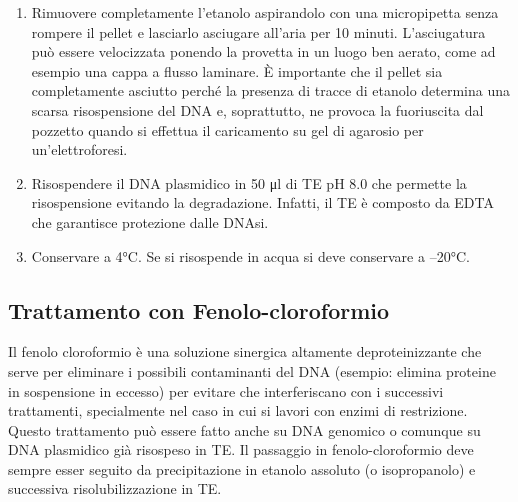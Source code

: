 \begin{enumerate}
  \item Rimuovere completamente l’etanolo aspirandolo con una micropipetta senza rompere il pellet e lasciarlo asciugare
	all’aria per 10 minuti. L’asciugatura può essere velocizzata ponendo la provetta in un luogo ben aerato,
	come ad esempio una cappa a flusso laminare.
	\`E importante che il pellet sia completamente asciutto perché la presenza di tracce di etanolo determina una scarsa
	risospensione del DNA e, soprattutto, ne provoca la fuoriuscita dal pozzetto quando si effettua il caricamento su gel di
	agarosio per un’elettroforesi.

  \item Risospendere il DNA plasmidico in 50 μl di TE pH 8.0 che permette la risospensione evitando la degradazione.
	Infatti, il TE è composto da EDTA che garantisce protezione dalle DNAsi.

  \item Conservare a 4°C. Se si risospende in acqua si deve conservare a –20°C.

\end{enumerate}

\subsection{Trattamento con Fenolo-cloroformio}

Il fenolo cloroformio è una soluzione sinergica altamente deproteinizzante che serve per eliminare i possibili
contaminanti del DNA (esempio: elimina proteine in sospensione in eccesso) per evitare che interferiscano con i
successivi trattamenti, specialmente nel caso in cui si lavori con enzimi di restrizione.
Questo trattamento può essere fatto anche su DNA genomico o comunque su DNA plasmidico già risospeso in TE.
Il passaggio in fenolo-cloroformio deve sempre esser seguito da precipitazione in etanolo assoluto (o isopropanolo)
e successiva risolubilizzazione in TE.

